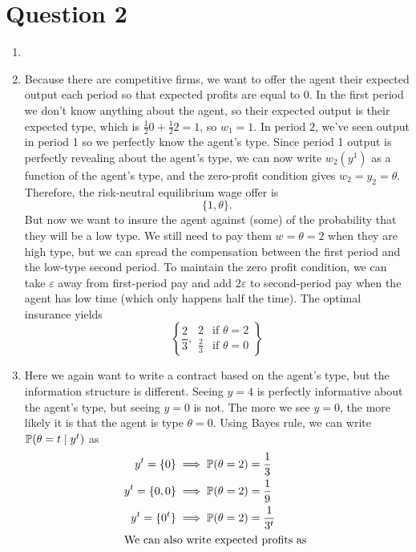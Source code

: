 \section{Question 2}
\begin{enumerate}[label=\alph*)]
\item {}
\item Because there are competitive firms, we want to offer the agent their expected output each period so that expected profits are equal to $0$. In the first period we don't know anything about the agent, so their expected output is their expected type, which is $\frac{1}{2} 0 + \frac{1}{2} 2 = 1$, so $w_1 = 1$. In period $2$, we've seen output in period 1 so we perfectly know the agent's type. Since period 1 output is perfectly revealing about the agent's type, we can now write $w_2(y^1)$ as a function of the agent's type, and the zero-profit condition gives $w_2 = y_2 = \theta$. Therefore, the risk-neutral equilibrium wage offer is
  \[
\{1, \theta\}.
  \]
  But now we want to insure the agent against (some) of the probability that they will be a low type. We still need to pay them $w = \theta = 2$ when they are high type, but we can spread the compensation between the first period and the low-type second period. To maintain the zero profit condition, we can take $\varepsilon$ away from first-period pay and add $2 \varepsilon$ to second-period pay when the agent has low time (which only happens half the time). The optimal insurance yields
  \[
    \left\{\frac{2}{3}, 
        \begin{array}{ll}
          2 &\text{if } \theta = 2\\
          \frac{2}{3} &\text{if } \theta = 0
        \end{array}
      \right\}
  \]
\item Here we again want to write a contract based on the agent's type, but the information structure is different. Seeing $y = 4$ is perfectly informative about the agent's type, but seeing $y = 0$ is not. The more we see $y = 0$, the more likely it is that the agent is type $\theta = 0$. Using Bayes rule, we can write $\mathbb{P}(\theta = t \mid y^t)$ as
  \begin{align*}
    y^t = \{0\} &\implies \p(\theta = 2) = \frac{1}{3}\\
    y^t = \{0, 0\} &\implies \p(\theta = 2) = \frac{1}{9}\\
    y^t = \{0^t\} &\implies \p(\theta = 2) = \frac{1}{3^t}\\
    \intertext{We can also write expected profits as }

\end{align*}
\end{enumerate}
